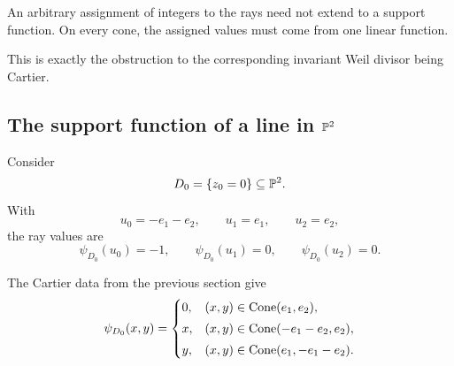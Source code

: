 \begin{warningbox}
An arbitrary assignment of integers to the rays need not extend to a
support function. On every cone, the assigned values must come from
one linear function.

This is exactly the obstruction to the corresponding invariant Weil
divisor being Cartier.
\end{warningbox}

\subsection{The support function of a line in \texorpdfstring{\(\mathbb{P}^2\)}{P2}}

Consider
\[
D_0=\{z_0=0\}\subseteq\mathbb{P}^2.
\]
With
\[
u_0=-e_1-e_2,\qquad
u_1=e_1,\qquad
u_2=e_2,
\]
the ray values are
\[
\psi_{D_0}(u_0)=-1,
\qquad
\psi_{D_0}(u_1)=0,
\qquad
\psi_{D_0}(u_2)=0.
\]

The Cartier data from the previous section give
\[
\psi_{D_0}(x,y)
=
\begin{cases}
0,
&
(x,y)\in\operatorname{Cone}(e_1,e_2),
\\[1mm]
x,
&
(x,y)\in\operatorname{Cone}(-e_1-e_2,e_2),
\\[1mm]
y,
&
(x,y)\in\operatorname{Cone}(e_1,-e_1-e_2).
\end{cases}
\]

